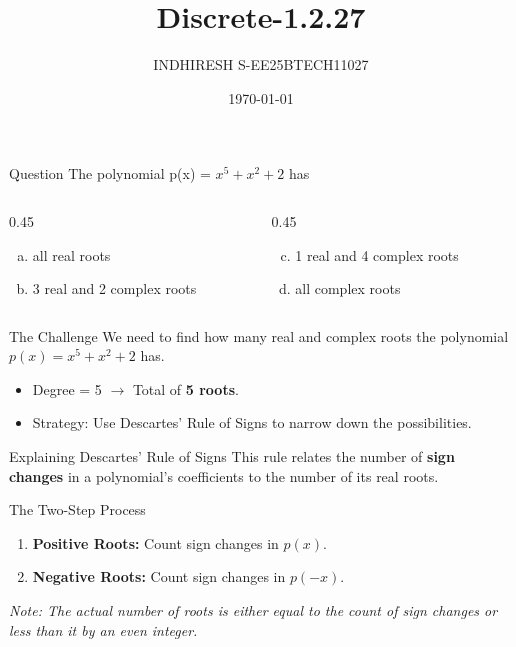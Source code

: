 \documentclass{beamer}
\title{Discrete-1.2.27}
\author{INDHIRESH S-EE25BTECH11027}
\date{\today}
\begin{document}
\begin{frame}
    \titlepage
\end{frame}

\begin{frame}{Question}
The polynomial p(x) = $x^5 + x^2 + 2$ has 
\begin{columns}[t]
    \begin{column}{0.45\textwidth}
        \begin{enumerate}[a)]
            \item all real roots
            \item 3 real and 2 complex roots
        \end{enumerate}
    \end{column}
    
    \begin{column}{0.45\textwidth}
        \begin{enumerate}[a)]
            \setcounter{enumi}{2} %
            \item 1 real and 4 complex roots
            \item all complex roots
        \end{enumerate}
    \end{column}
\end{columns}
\end{frame}



\begin{frame}{The Challenge}
    We need to find how many real and complex roots the polynomial $p(x) = x^5 + x^2 + 2$ has.
    \begin{itemize}
        \item Degree = 5 $\rightarrow$ Total of \textbf{5 roots}.
        \item Strategy: Use Descartes' Rule of Signs to narrow down the possibilities.
    \end{itemize}
\end{frame}

\begin{frame}{Explaining Descartes' Rule of Signs}
    This rule relates the number of \textbf{sign changes} in a polynomial's coefficients to the number of its real roots.
    
    \begin{block}{The Two-Step Process}
    \begin{enumerate}
        \item \textbf{Positive Roots:} Count sign changes in $p(x)$.
        \item \textbf{Negative Roots:} Count sign changes in $p(-x)$.
    \end{enumerate}
    \end{block}
    \textit{Note: The actual number of roots is either equal to the count of sign changes or less than it by an even integer.}
\end{frame}
\end{document}
